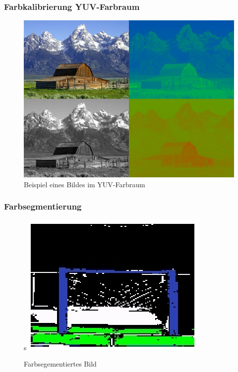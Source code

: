 \documentclass[a4paper,12pt]{article}
\begin{document}
\subsubsection{Farbkalibrierung YUV-Farbraum}
\begin{figure}[H]
\includegraphics[scale=0.5]{Barn-yuv.png}
\caption{Beispiel eines Bildes im YUV-Farbraum}
\label{fig:yuv}
\end{figure}

\subsubsection{Farbsegmentierung}

\begin{figure}[H]s
\includegraphics{segmented-view2.png}
\caption{Farbsegementiertes Bild}
\label{fig:color-seg}
\end{figure}
\end{document}
